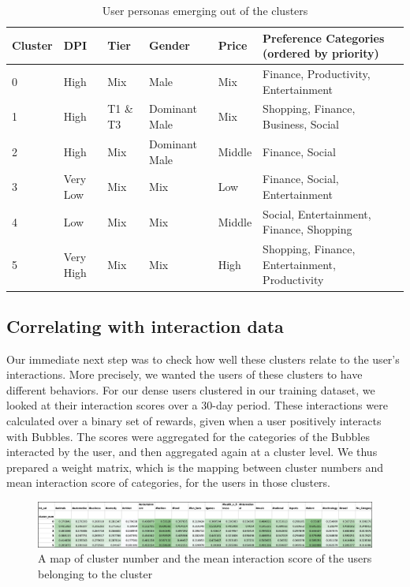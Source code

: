 \begin{table}
  \caption{User personas emerging out of the clusters}
  \label{tab:persona}
  \begin{tabular}{llllll}
    \toprule
    Cluster&DPI&Tier&Gender&Price&Preference Categories (ordered by priority)\\
    \midrule
    0 & High & Mix & Male & Mix & Finance, Productivity, Entertainment\\
    1 & High & T1 \& T3 & Dominant Male & Mix & Shopping, Finance, Business, Social\\
    2 & High & Mix & Dominant Male & Middle & Finance, Social\\
    3 & Very Low & Mix & Mix & Low & Finance, Social, Entertainment\\
    4 & Low & Mix & Mix & Middle & Social, Entertainment, Finance, Shopping\\
    5 & Very High & Mix & Mix & High & Shopping, Finance, Entertainment, Productivity\\
  \bottomrule
\end{tabular}
\end{table}



\subsection{Correlating with interaction data}

Our immediate next step was to check how well these clusters relate to the user’s interactions. More precisely, we wanted the users of these clusters to have different behaviors. For our dense users clustered in our training dataset, we looked at their interaction scores over a 30-day period. These interactions were calculated over a binary set of rewards, given when a user positively interacts with Bubbles. The scores were aggregated for the categories of the Bubbles interacted by the user, and then aggregated again at a cluster level. We thus prepared a weight matrix, which is the mapping between cluster numbers and mean interaction score of categories, for the users in those clusters. 

\begin{figure}
  \centering
  \includegraphics[width=\linewidth]{figures/mean_weight_matrix.jpg}
  \caption[Mean Weight Matrix]{A map of cluster number and the mean interaction score of the users belonging to the cluster}
  \label{fig:mean_weight_matrix}
\end{figure}

